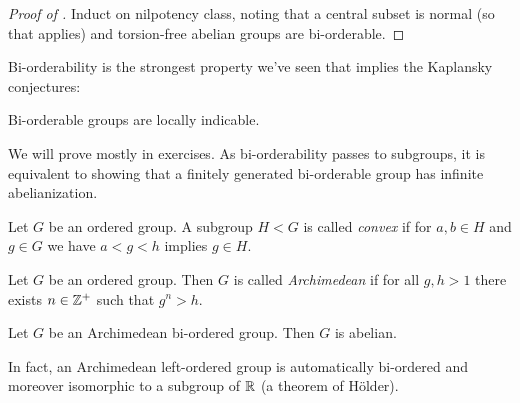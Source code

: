 \begin{proof}[Proof of ]
    Induct on nilpotency class, noting that a central subset is normal (so that  applies) and torsion-free abelian groups are bi-orderable.
\end{proof}

Bi-orderability is the strongest property we've seen that implies the Kaplansky conjectures:

\begin{proposition}
    \label{proposition:biorderable_LI}
    Bi-orderable groups are locally indicable.
\end{proposition}

We will prove  mostly in exercises.
As bi-orderability passes to subgroups, it is equivalent to showing that a finitely generated bi-orderable group has infinite abelianization.

\begin{definition}
    Let $G$ be an ordered group.
    A subgroup $H < G$ is called \emph{convex} if for $a, b \in H$ and $g \in G$ we have $a < g < h$ implies $g \in H$.
\end{definition}

\begin{definition}
    Let $G$ be an ordered group.
    Then $G$ is called \emph{Archimedean} if for all $g, h > 1$ there exists $n \in \mathbb{Z}^+$ such that $g^n > h$.
\end{definition}

\begin{proposition}
    Let $G$ be an Archimedean bi-ordered group.
    Then $G$ is abelian.
\end{proposition}

\begin{remark}
    In fact, an Archimedean left-ordered group is automatically bi-ordered and moreover isomorphic to a subgroup of $\mathbb{R}$ (a theorem of Hölder).
\end{remark}

